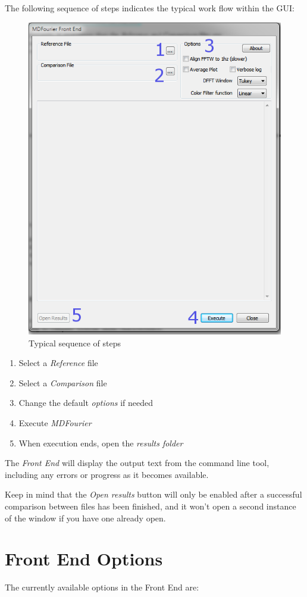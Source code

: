 \documentclass[10pt,a4paper]{report}
\begin{document}
The following sequence of steps indicates the typical work flow within the GUI:

\begin{figure}[H]
	\centering
	\includegraphics[width=0.6\linewidth]{plots/GUI2.png}
	\caption[Steps]{Typical sequence of steps}
	\label{fig:gui2}
\end{figure}

\begin{enumerate}
	\item Select a \textit{Reference} file
	\item Select a \textit{Comparison} file
	\item Change the default \textit{options} if needed
	\item Execute \textit{MDFourier}
	\item When execution ends, open the \textit{results folder}
\end{enumerate}

The \textit{Front End} will display the output text from the command line tool, including any errors or progress as it becomes available.

Keep in mind that the \textit{Open results} button will only be enabled after a successful comparison between files has been finished, and it won't open a second instance of the window if you have one already open.

\section{Front End Options}

The currently available options in the Front End are:
\end{document}
